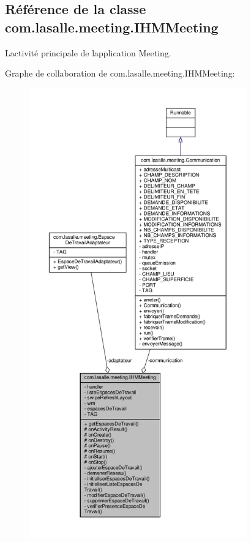 \hypertarget{classcom_1_1lasalle_1_1meeting_1_1_i_h_m_meeting}{}\subsection{Référence de la classe com.\+lasalle.\+meeting.\+I\+H\+M\+Meeting}
\label{classcom_1_1lasalle_1_1meeting_1_1_i_h_m_meeting}


L\textquotesingle{}activité principale de l\textquotesingle{}application Meeting.  




Graphe de collaboration de com.\+lasalle.\+meeting.\+I\+H\+M\+Meeting\+:\nopagebreak
\begin{figure}[H]
\begin{center}
\leavevmode
\includegraphics[height=550pt]{classcom_1_1lasalle_1_1meeting_1_1_i_h_m_meeting__coll__graph}
\end{center}
\end{figure}
